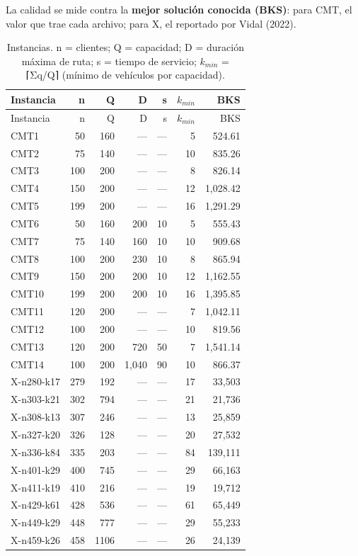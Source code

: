 \documentclass[11pt,letterpaper]{article}
\begin{document}
La calidad se mide contra la \textbf{mejor solución conocida (BKS)}: para CMT, el valor que trae cada archivo; para X, el reportado por Vidal (2022).

{\small\setlength{\tabcolsep}{4pt}
\begin{longtable}[]{@{}lrrrrrr@{}}
\caption{Instancias. n = clientes; Q = capacidad; D = duración máxima de ruta; s = tiempo de servicio; \(k_{min}\) = ⌈Σq/Q⌉ (mínimo de vehículos por capacidad).}\tabularnewline
\toprule\noalign{}
Instancia & n & Q & D & s & \(k_{min}\) & BKS \\
\midrule\noalign{}
\endfirsthead
\toprule\noalign{}
Instancia & n & Q & D & s & \(k_{min}\) & BKS \\
\midrule\noalign{}
\endhead
\bottomrule\noalign{}
\endlastfoot
CMT1 & 50 & 160 & --- & --- & 5 & 524.61 \\
CMT2 & 75 & 140 & --- & --- & 10 & 835.26 \\
CMT3 & 100 & 200 & --- & --- & 8 & 826.14 \\
CMT4 & 150 & 200 & --- & --- & 12 & 1,028.42 \\
CMT5 & 199 & 200 & --- & --- & 16 & 1,291.29 \\
CMT6 & 50 & 160 & 200 & 10 & 5 & 555.43 \\
CMT7 & 75 & 140 & 160 & 10 & 10 & 909.68 \\
CMT8 & 100 & 200 & 230 & 10 & 8 & 865.94 \\
CMT9 & 150 & 200 & 200 & 10 & 12 & 1,162.55 \\
CMT10 & 199 & 200 & 200 & 10 & 16 & 1,395.85 \\
CMT11 & 120 & 200 & --- & --- & 7 & 1,042.11 \\
CMT12 & 100 & 200 & --- & --- & 10 & 819.56 \\
CMT13 & 120 & 200 & 720 & 50 & 7 & 1,541.14 \\
CMT14 & 100 & 200 & 1,040 & 90 & 10 & 866.37 \\
X-n280-k17 & 279 & 192 & --- & --- & 17 & 33,503 \\
X-n303-k21 & 302 & 794 & --- & --- & 21 & 21,736 \\
X-n308-k13 & 307 & 246 & --- & --- & 13 & 25,859 \\
X-n327-k20 & 326 & 128 & --- & --- & 20 & 27,532 \\
X-n336-k84 & 335 & 203 & --- & --- & 84 & 139,111 \\
X-n401-k29 & 400 & 745 & --- & --- & 29 & 66,163 \\
X-n411-k19 & 410 & 216 & --- & --- & 19 & 19,712 \\
X-n429-k61 & 428 & 536 & --- & --- & 61 & 65,449 \\
X-n449-k29 & 448 & 777 & --- & --- & 29 & 55,233 \\
X-n459-k26 & 458 & 1106 & --- & --- & 26 & 24,139 \\
\end{longtable}
}
\end{document}
